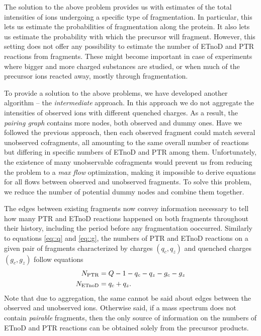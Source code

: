 \documentclass[journal=ancham, manuscript=article, layout=twocolumn]{achemso}
\begin{document}
The solution to the above problem provides us with estimates of the total intensities of ions undergoing a specific type of fragmentation. 
In particular, this lets us estimate the probabilities of fragmentation along the protein. 
It also lets us estimate the probability with which the precursor will fragment. 
However, this setting does not offer any possibility to estimate the number of ETnoD and PTR reactions from fragments. 
These might become important in case of experiments where bigger and more charged substances are studied, or when much of the precursor ions reacted away, mostly through fragmentation.

To provide a solution to the above problems, we have developed another algorithm -- the \textit{intermediate} approach. 
In this approach we do not aggregate the intensities of observed ions with different quenched charges. 
As a result, the \textit{pairing graph} contains more nodes, both observed and dummy ones.
Have we followed the previous approach, then each observed fragment could match  several unobserved cofragments, all amounting to the same overall number of reactions but differing in specific numbers of ETnoD and PTR among them.
Unfortunately, the existence of many unobservable cofragments would prevent us from reducing the problem to a \textit{max flow} optimization, making it impossible to derive equations for all flows between observed and unobserved fragments. 
To solve this problem, we reduce the number of potential dummy nodes and combine them together.

The edges between existing fragments now convey information necessary to tell how many PTR and ETnoD reactions happened on both fragments throughout their history, including the period before any fragmentation ooccurred.
Similarly to equations \eqref{eq::q} and \eqref{eq::g}, the numbers of PTR and ETnoD reactions on a given pair of fragments characterized by charges $(q_c, q_z)$ and quenched charges $(g_c, g_z)$ follow equations
\begin{align}
	N_\text{PTR}	&= Q - 1 - q_c - q_z - g_c - g_z\notag\\
	N_\text{ETnoD}	&= q_c + q_z.\notag
\end{align}
Note that due to aggregation, the same cannot be said about edges between the observed and unobserved ions.
Otherwise said, if a mass spectrum does not contain \textit{pairable} fragments, then the only source of information on the numbers of ETnoD and PTR reactions can be obtained solely from the precursor products.
\end{document}
